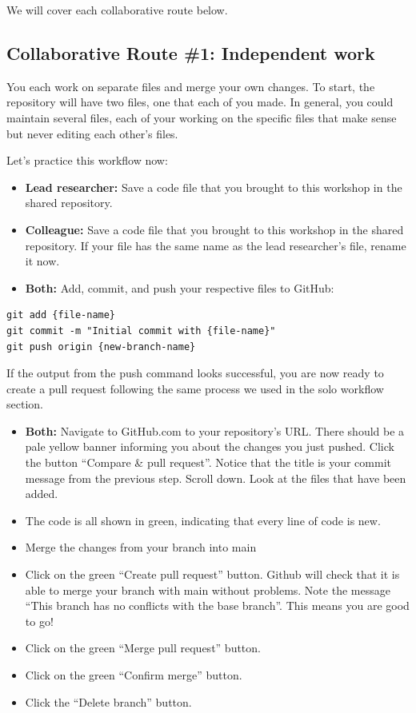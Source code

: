 \documentclass[
]{book}
\providecommand{\tightlist}{%
  \setlength{\itemsep}{0pt}\setlength{\parskip}{0pt}}
\begin{document}
We will cover each collaborative route below.

\subsection{Collaborative Route \#1: Independent work}\label{collaborative-route-1-independent-work}

You each work on separate files and merge your own changes. To start, the
repository will have two files, one that each of you made. In general, you could
maintain several files, each of your working on the specific files that make
sense but never editing each other's files.

Let's practice this workflow now:

\begin{itemize}
\tightlist
\item
  \textbf{Lead researcher:} Save a code file that you brought to this workshop in the shared repository.
\item
  \textbf{Colleague:} Save a code file that you brought to this workshop in the shared repository. If
  your file has the same name as the lead researcher's file, rename it now.
\item
  \textbf{Both:} Add, commit, and push your respective files to GitHub:
\end{itemize}

\begin{verbatim}
git add {file-name}
git commit -m "Initial commit with {file-name}"
git push origin {new-branch-name}
\end{verbatim}

If the output from the push command looks successful, you are now ready to create
a pull request following the same process we used in the solo workflow section.

\begin{itemize}
\tightlist
\item
  \textbf{Both:} Navigate to GitHub.com to your repository's URL. There should be a pale yellow
  banner informing you about the changes you just pushed. Click the button
  ``Compare \& pull request''. Notice that the title is your commit message from the
  previous step. Scroll down. Look at the files that have been added.
\item
  The code is all shown in green, indicating that every line of code is new.
\item
  Merge the changes from your branch into main
\item
  Click on the green ``Create pull request'' button. Github will check that it
  is able to merge your branch with main without problems. Note the message ``This
  branch has no conflicts with the base branch''. This means you are good to go!
\item
  Click on the green ``Merge pull request'' button.\\
\item
  Click on the green ``Confirm merge'' button.
\item
  Click the ``Delete branch'' button.
\end{itemize}
\end{document}
